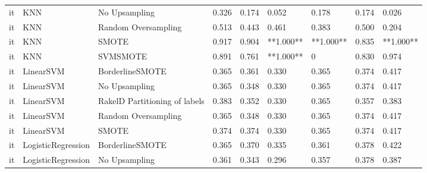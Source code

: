 \begin{tabular}{lllllllll}
      it &                             KNN &                 No Upsampling & 0.326 &                     0.174 &                 0.052 &                  0.178 &                                   0.174 &     0.026 \\
      it &                             KNN &           Random Oversampling & 0.513 &                     0.443 &                 0.461 &                  0.383 &                                   0.500 &     0.204 \\
      it &                             KNN &                         SMOTE & 0.917 &                     0.904 &             **1.000** &              **1.000** &                                   0.835 & **1.000** \\
      it &                             KNN &                      SVMSMOTE & 0.891 &                     0.761 &             **1.000** &                      0 &                                   0.830 &     0.974 \\
      it &                       LinearSVM &               BorderlineSMOTE & 0.365 &                     0.361 &                 0.330 &                  0.365 &                                   0.374 &     0.417 \\
      it &                       LinearSVM &                 No Upsampling & 0.365 &                     0.348 &                 0.330 &                  0.365 &                                   0.374 &     0.417 \\
      it &                       LinearSVM & RakelD Partitioning of labels & 0.383 &                     0.352 &                 0.330 &                  0.365 &                                   0.357 &     0.383 \\
      it &                       LinearSVM &           Random Oversampling & 0.365 &                     0.348 &                 0.330 &                  0.365 &                                   0.374 &     0.417 \\
      it &                       LinearSVM &                         SMOTE & 0.374 &                     0.374 &                 0.330 &                  0.365 &                                   0.374 &     0.417 \\
      it &              LogisticRegression &               BorderlineSMOTE & 0.365 &                     0.370 &                 0.335 &                  0.361 &                                   0.378 &     0.422 \\
      it &              LogisticRegression &                 No Upsampling & 0.361 &                     0.343 &                 0.296 &                  0.357 &                                   0.378 &     0.387 \\

\end{tabular}
